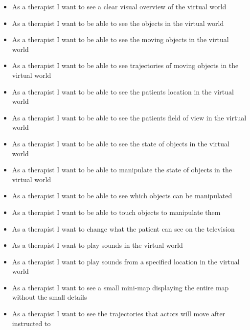 \documentclass[11pt]{article}
\begin{document}
    \begin{itemize}
		\item As a therapist I want to see a clear visual overview of the virtual world
        \item As a therapist I want to be able to see the objects in the virtual world
        \item As a therapist I want to be able to see the moving objects in the virtual world
        \item As a therapist I want to be able to see trajectories of moving objects in the virtual world
        \item As a therapist I want to be able to see the patients location in the virtual world
        \item As a therapist I want to be able to see the patients field of view in the virtual world
        \item As a therapist I want to be able to see the state of objects in the virtual world
        \item As a therapist I want to be able to manipulate the state of objects in the virtual world
        \item As a therapist I want to be able to see which objects can be manipulated
        \item As a therapist I want to be able to touch objects to manipulate them
        \item As a therapist I want to change what the patient can see on the television
        \item As a therapist I want to play sounds in the virtual world
        \item As a therapist I want to play sounds from a specified location in the virtual world
        \item As a therapist I want to see a small mini-map displaying the entire map without the small details
        \item As a therapist I want to see the trajectories that actors will move after instructed to

	\end{itemize}
    
\end{document}
